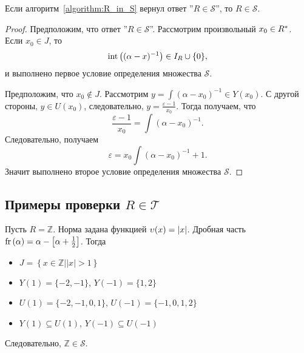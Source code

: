 \documentclass[_00_dissertation.tex]{subfiles}
\begin{document}
\begin{lemma}
    Если алгоритм~\ref{algorithm:R_in_S} вернул ответ ''$R \in \mathcal{S}$'', то $R \in \mathcal{S}$.
\end{lemma}
\begin{proof}
    Предположим, что ответ ''$R \in \mathcal{S}$''.
    Рассмотрим произвольный $x_0 \in R^{*}$.
    Если $x_0 \in J$, то
    \begin{equation*}
        \textrm{int}\left((\alpha - x)^{-1}\right) \in I_{R} \cup \{0\},
    \end{equation*}
    и выполнено первое условие определения множества $\mathcal{S}$.
    
    Предположим, что $x_0 \not\in J$.
    Рассмотрим $y = \int{(\alpha - x_0)^{-1}} \in Y(x_0)$.
    С другой стороны, $y \in U(x_0)$, следовательно, $y = \frac{\varepsilon - 1}{x_0}$.
    Тогда получаем, что
    \begin{equation*}
        \frac{\varepsilon - 1}{x_0} = \int{(\alpha - x_0)^{-1}}.
    \end{equation*}
    Следовательно, получаем
    \begin{equation*}
        \varepsilon = x_0 \int{(\alpha - x_0)^{-1}} + 1.
    \end{equation*}
    Значит выполнено второе условие определения множества $\mathcal{S}$.
\end{proof}

\subsection{Примеры проверки $R \in \mathcal{T}$}

\begin{example}\label{example:Z}
    Пусть $R = \mathbb{Z}$.
    Норма задана функцией $\upsilon(x) = |x|$.
    Дробная часть $\textrm{fr}\left(\alpha\right) = \alpha - \left[\alpha + \frac{1}{2}\right]$.
    Тогда
    \begin{itemize}
        \item $J = \left\{x \in \mathbb{Z} \big| |x| > 1\right\}$
        
        \item $Y(1) = \{-2, -1\}$, $Y(-1) = \{1, 2\}$
        
        \item $U(1) = \{-2, -1, 0, 1\}$, $U(-1) = \{-1, 0, 1, 2\}$
        
        \item $Y(1) \subseteq U(1)$, $Y(-1) \subseteq U(-1)$
    \end{itemize}
    
    Следовательно, $\mathbb{Z} \in \mathcal{S}$.
\end{example}
\end{document}
